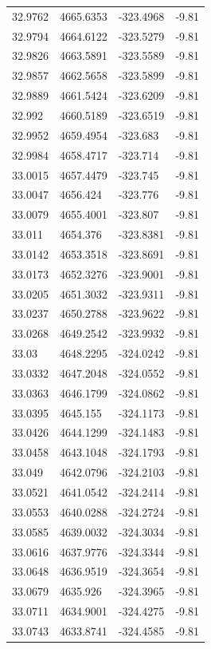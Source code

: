 \begin{table}[H]
\begin{tabular}{llll}
32.9762 & 4665.6353 & -323.4968 & -9.81 \\
32.9794 & 4664.6122 & -323.5279 & -9.81 \\
32.9826 & 4663.5891 & -323.5589 & -9.81 \\
32.9857 & 4662.5658 & -323.5899 & -9.81 \\
32.9889 & 4661.5424 & -323.6209 & -9.81 \\
32.992 & 4660.5189 & -323.6519 & -9.81 \\
32.9952 & 4659.4954 & -323.683 & -9.81 \\
32.9984 & 4658.4717 & -323.714 & -9.81 \\
33.0015 & 4657.4479 & -323.745 & -9.81 \\
33.0047 & 4656.424 & -323.776 & -9.81 \\
33.0079 & 4655.4001 & -323.807 & -9.81 \\
33.011 & 4654.376 & -323.8381 & -9.81 \\
33.0142 & 4653.3518 & -323.8691 & -9.81 \\
33.0173 & 4652.3276 & -323.9001 & -9.81 \\
33.0205 & 4651.3032 & -323.9311 & -9.81 \\
33.0237 & 4650.2788 & -323.9622 & -9.81 \\
33.0268 & 4649.2542 & -323.9932 & -9.81 \\
33.03 & 4648.2295 & -324.0242 & -9.81 \\
33.0332 & 4647.2048 & -324.0552 & -9.81 \\
33.0363 & 4646.1799 & -324.0862 & -9.81 \\
33.0395 & 4645.155 & -324.1173 & -9.81 \\
33.0426 & 4644.1299 & -324.1483 & -9.81 \\
33.0458 & 4643.1048 & -324.1793 & -9.81 \\
33.049 & 4642.0796 & -324.2103 & -9.81 \\
33.0521 & 4641.0542 & -324.2414 & -9.81 \\
33.0553 & 4640.0288 & -324.2724 & -9.81 \\
33.0585 & 4639.0032 & -324.3034 & -9.81 \\
33.0616 & 4637.9776 & -324.3344 & -9.81 \\
33.0648 & 4636.9519 & -324.3654 & -9.81 \\
33.0679 & 4635.926 & -324.3965 & -9.81 \\
33.0711 & 4634.9001 & -324.4275 & -9.81 \\
33.0743 & 4633.8741 & -324.4585 & -9.81 \\

\end{tabular}
\end{table}
